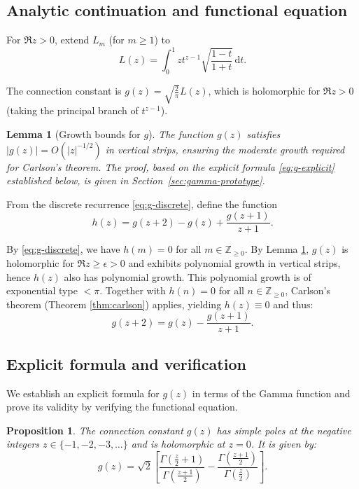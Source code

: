 \documentclass[11pt,reqno]{amsart}
\newtheorem{lemma}[theorem]{Lemma}
\newtheorem{proposition}[theorem]{Proposition}
\theoremstyle{definition}
\newcommand{\N}{\mathbb{Z}_{\ge 0}}
\newcommand{\dd}{\mathrm{d}}
\numberwithin{equation}{section}
\begin{document}
\subsection{Analytic continuation and functional equation}

For $\Re z > 0$, extend $L_m$ (for $m \geq 1$) to 
$$L(z) = \int_0^1 zt^{z-1}\sqrt{\frac{1-t}{1+t}}\, \dd t.$$ 

The connection constant is $g(z) = \sqrt{\frac{2}{\pi}}L(z)$, which is holomorphic for $\Re z > 0$ (taking the principal branch of $t^{z-1}$).

\begin{lemma}[Growth bounds for $g$]\label{lem:growth-g}
The function $g(z)$ satisfies $|g(z)| = O(|z|^{-1/2})$ in vertical strips, ensuring the moderate growth required for Carlson's theorem. The proof, based on the explicit formula \eqref{eq:g-explicit} established below, is given in Section~\ref{sec:gamma-prototype}.
\end{lemma}
From the discrete recurrence \eqref{eq:g-discrete}, define the function 
$$h(z) = g(z+2) - g(z) + \frac{g(z+1)}{z+1}.$$ 

By \eqref{eq:g-discrete}, we have $h(m)=0$ for all $m\in\N$. By Lemma \ref{lem:growth-g}, $g(z)$ is holomorphic for $\Re z \geq \epsilon > 0$ and exhibits polynomial growth in vertical strips, hence $h(z)$ also has polynomial growth. This polynomial growth is of exponential type $<\pi$. Together with $h(n)=0$ for all $n\in\N$, Carlson's theorem (Theorem \ref{thm:carlson}) applies, yielding $h(z) \equiv 0$ and thus:
\begin{equation}\label{eq:g-AFE}
g(z+2) = g(z) - \frac{g(z+1)}{z+1}.
\end{equation}

\subsection{Explicit formula and verification}

We establish an explicit formula for $g(z)$ in terms of the Gamma function and prove its validity by verifying the functional equation.

\begin{proposition}\label{prop:g-explicit}
The connection constant $g(z)$ has simple poles at the negative integers $z \in \{-1,-2,-3,\ldots\}$ and is holomorphic at $z=0$. It is given by:
\begin{equation}\label{eq:g-explicit}
g(z) = \sqrt{2}\left[\frac{\Gamma\left(\frac{z}{2}+1\right)}{\Gamma\left(\frac{z+1}{2}\right)} - \frac{\Gamma\left(\frac{z+1}{2}\right)}{\Gamma\left(\frac{z}{2}\right)}\right].
\end{equation}
\end{proposition}
\end{document}
